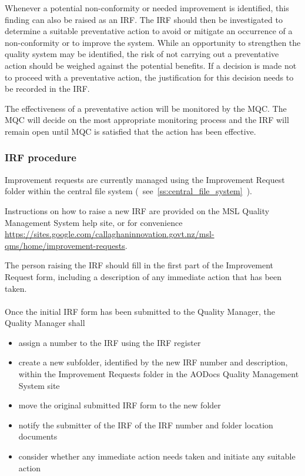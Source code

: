 Whenever a potential non-conformity or needed improvement is identified, this finding can also be raised as an IRF. The IRF should then be investigated to determine a suitable preventative action to avoid or mitigate an occurrence of a non-conformity or to improve the system. While an opportunity to strengthen the quality system may be identified, the risk of not carrying out a preventative action should be weighed against the potential benefits. If a decision is made not to proceed with a preventative action, the justification for this decision needs to be recorded in the IRF.

The effectiveness of a preventative action will be monitored by the MQC. The MQC will decide on the most appropriate monitoring process and the IRF will remain open until MQC is satisfied that the action has been effective. 

\subsubsection{IRF procedure}
\label{sss:irf_procedure}
Improvement requests are currently managed using the Improvement Request folder within the central file system (~see~\ref{ss:central_file_system}~). 

Instructions on how to raise a new IRF are provided on the MSL Quality Management System help site, or for convenience \\
\url{https://sites.google.com/callaghaninnovation.govt.nz/msl-qms/home/improvement-requests}.

The person raising the IRF should fill in the first part of the Improvement Request form, including a description of any immediate action that has been taken. \\
\\
Once the initial IRF form has been submitted to the Quality Manager, the Quality Manager shall
\begin{itemize} 
\item assign a number to the IRF using the IRF register
\item create a new subfolder, identified by the new IRF number and description, within the Improvement Requests folder in the AODocs Quality Management System site
\item move the original submitted IRF form to the new folder
\item notify the submitter of the IRF of the IRF number and folder location documents
\item consider whether any immediate action needs taken and initiate any suitable action
\end{itemize}


